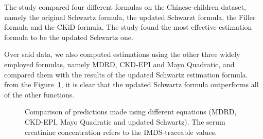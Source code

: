 \documentclass[10pt,final]{siamltex}
\begin{document}
The study \cite{gfr} compared four different formulas on the Chinese-children dataset, namely the original Schwartz formula, the updated Schwarzt formula, the Filler formula and the CKiD formula. The study found the most effective estimation formula to be the updated Schwartz one.

Over said data, we also computed estimations using the other three widely employed formulas, namely MDRD, CKD-EPI and Mayo Quadratic, and compared them with the results of the updated Schwartz estimation formula.
from the Figure~\ref{equations}, it is clear that the updated Schwartz formula outperforms all of the other functions.
%
\begin{figure}[ht]
  \centering
  \caption{Comparison of predictions made using different equations (MDRD, CKD-EPI, Mayo Quadratic and updated Schwartz). The serum creatinine concentration refers to the IMDS-traceable values.}
  \label{equations}
\end{figure}
\end{document}
